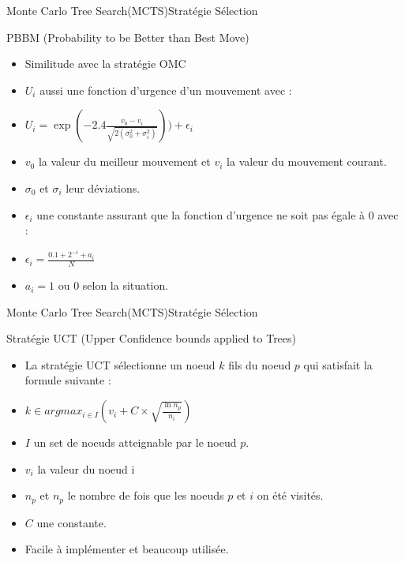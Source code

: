\begin{frame}{Monte Carlo Tree Search(MCTS)}{Stratégie Sélection}
	\begin{block}{PBBM (Probability to be Better than Best Move)}
		\begin{itemize}
			\item Similitude avec la stratégie OMC
			\item $U_{i}$ aussi une fonction d'urgence d'un mouvement avec :
			\item $U_{i} = \exp(-2.4\frac{v_{0} - v_{i}}{\sqrt{2(\sigma_{0}^2 + \sigma_{i}^2)}})) + \epsilon_{i}$
			\item $v_{0}$ la valeur du meilleur mouvement et $v_{i}$ la valeur du mouvement courant.
			\item $\sigma_{0}$ et $\sigma_{i}$ leur déviations.
			\item $\epsilon_ {i}$ une constante assurant que la fonction d'urgence ne soit pas égale à 0 avec :
			\item $\epsilon_ {i} = \frac{0.1 + 2^{-i} + a_{i}}{N}$
			\item $a_{i} = 1$ ou $0$ selon la situation.
		\end{itemize}
	\end{block}
\end{frame}

\begin{frame}{Monte Carlo Tree Search(MCTS)}{Stratégie Sélection}
	\begin{block}{Stratégie UCT (Upper Confidence bounds applied to Trees)}
		\begin{itemize}
			\item La stratégie UCT sélectionne un noeud $k$ fils du noeud $p$ qui satisfait la formule suivante :
			\item $k \in argmax_{i\in I}(v_{i} + C \times \sqrt{\frac{\ln n_{p}}{n_{i}}})$
			\item $I$ un set de noeuds atteignable par le noeud $p$.
			\item $v_{i}$ la valeur du noeud i
			\item $n_{p}$ et $n_{p}$ le nombre de fois que les noeuds $p$ et $i$ on été visités.
			\item $C$ une constante.
			\item Facile à implémenter et beaucoup utilisée.
		\end{itemize}
	\end{block}
\end{frame}

